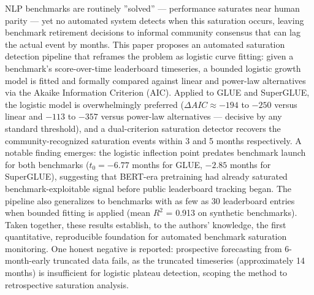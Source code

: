 
NLP benchmarks are routinely ''solved'' --- performance saturates near human parity --- yet no automated system detects when this saturation occurs, leaving benchmark retirement decisions to informal community consensus that can lag the actual event by months. This paper proposes an automated saturation detection pipeline that reframes the problem as logistic curve fitting: given a benchmark's score-over-time leaderboard timeseries, a bounded logistic growth model is fitted and formally compared against linear and power-law alternatives via the Akaike Information Criterion (AIC). Applied to GLUE and SuperGLUE, the logistic model is overwhelmingly preferred ($\Delta AIC \approx -194$ to $-250$ versus linear and $-113$ to $-357$ versus power-law alternatives --- decisive by any standard threshold), and a dual-criterion saturation detector recovers the community-recognized saturation events within 3 and 5 months respectively. A notable finding emerges: the logistic inflection point predates benchmark launch for both benchmarks ($t_0 = -6.77$ months for GLUE, $-2.85$ months for SuperGLUE), suggesting that BERT-era pretraining had already saturated benchmark-exploitable signal before public leaderboard tracking began. The pipeline also generalizes to benchmarks with as few as 30 leaderboard entries when bounded fitting is applied (mean $R^2$ = 0.913 on synthetic benchmarks). Taken together, these results establish, to the authors' knowledge, the first quantitative, reproducible foundation for automated benchmark saturation monitoring. One honest negative is reported: prospective forecasting from 6-month-early truncated data fails, as the truncated timeseries (approximately 14 months) is insufficient for logistic plateau detection, scoping the method to retrospective saturation analysis.

